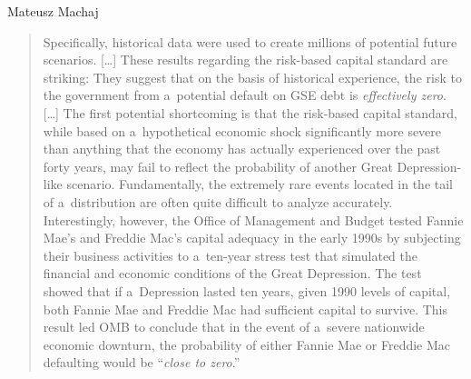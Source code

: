 \begin{artengenv}{Mateusz Machaj}
\begin{quote}
Specifically, historical data were used to create millions of potential future scenarios. […] These results regarding the risk-based capital standard are striking: They suggest that on the basis of historical experience, the risk to the government from a~potential default on GSE debt is \textit{effectively zero}. […] The first potential shortcoming is that the risk-based capital standard, while based on a~hypothetical economic shock significantly more severe than anything that the economy has actually experienced over the past forty years, may fail to reflect the probability of another Great Depression-like scenario. Fundamentally, the extremely rare events located in the tail of a~distribution are often quite difficult to analyze accurately. Interestingly, however, the Office of Management and Budget tested Fannie Mae's and Freddie Mac's capital adequacy in the early 1990s by subjecting their business activities to a~ten-year stress test that simulated the financial and economic conditions of the Great Depression. The test showed that if a~Depression lasted ten years, given 1990 levels of capital, both Fannie Mae and Freddie Mac had sufficient capital to survive. This result led OMB to conclude that in the event of a~severe nationwide economic downturn, the probability of either Fannie Mae or Freddie Mac defaulting would be ``\textit{close to zero}.'' 
\parencite[][p.5, emphasis added]{stiglitz_implications_2002}%
\end{quote}





\end{artengenv}
